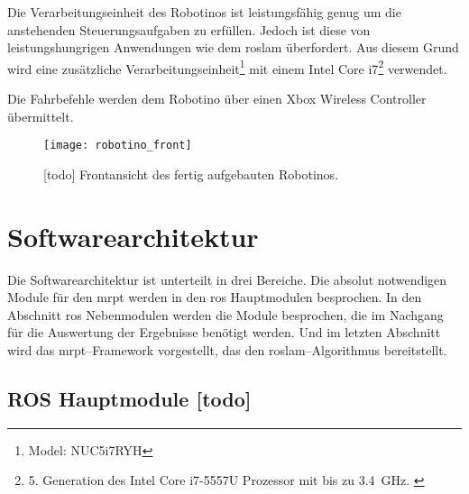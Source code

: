 Die Verarbeitungseinheit des Robotinos ist leistungsfähig genug um die anstehenden Steuerungsaufgaben zu erfüllen. Jedoch ist diese von leistungshungrigen Anwendungen wie dem \Gls{roslam} überfordert. Aus diesem Grund wird eine zusätzliche Verarbeitungseinheit\footnote{Model: NUC5i7RYH} mit einem Intel Core i7\footnote{5. Generation des Intel Core i7-5557U Prozessor mit bis zu \SI{3.4}{\GHz}. \cite{intel2015nucproductbrief}} verwendet.

Die Fahrbefehle werden dem Robotino über einen Xbox Wireless Controller übermittelt.

\begin{figure}[h]
	\centering
	\texttt{[image: robotino\_front]}
	\caption{[todo] Frontansicht des fertig aufgebauten Robotinos.}
	\label{fig:robotino_front}
\end{figure}


\begin{comment}
--------------------------------------------------------------------------------
- Kurzbeschreibung der Modulfunktion
- Welche Funktion erfüllt dieses Modul
- Welche ROS-Messages/-Topics/-Services bietet dieses Modul
\end{comment}
\section{Softwarearchitektur}

Die Softwarearchitektur ist unterteilt in drei Bereiche. Die absolut notwendigen Module für den \Gls{mrpt} werden in den \Gls{ros} Hauptmodulen besprochen. In den Abschnitt \Gls{ros} Nebenmodulen werden die Module besprochen, die im Nachgang für die Auswertung der Ergebnisse benötigt werden. Und im letzten Abschnitt wird das \Gls{mrpt}--Framework vorgestellt, das den \Gls{roslam}--Algorithmus bereitstellt.


\begin{comment}
--------------------------------------------------------------------------------
- Begrifflichkeiten wie Topic, Sessage, Service usw. wurden bereits im Grundlagenkapitel geklärt.
- TODO: Grundlagen ROS: URDF, Lauch-Files, TF-Tree (odom, base_link, map?), Wofür braucht man Koordinatensystemtransformationen?
\end{comment}
\subsection{ROS Hauptmodule [todo]}


\begin{comment}
--------------------------------------------------------------------------------
- \url{http://wiki.ros.org/robotino_node}
\end{comment}
